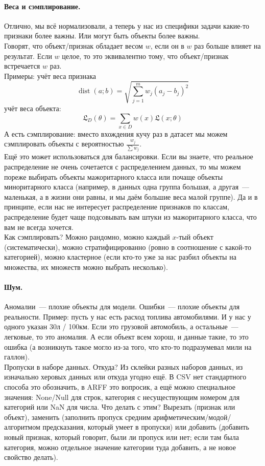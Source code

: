 \documentclass{article}
\begin{document}
    \paragraph{Веса и сэмплирование.}
    Отлично, мы всё нормализовали, а теперь у нас из специфики задачи какие-то признаки более важны. Или могут быть объекты более важны.\\
    Говорят, что объект/признак обладает весом $w$, если он в $w$ раз больше влияет на результат. Если $w$ целое, то это эквивалентно тому, что объект/признак встречается $w$ раз.\\
    Примеры: учёт веса признака
    \[
    \operatorname{dist}(a;b)=\sqrt{\sum\limits_{j=1}^mw_j(a_j-b_j)^2}
    \]
    учёт веса объекта:
    \[
    \mathfrak L_D(\theta)=\sum\limits_{x\in D}w(x)\mathfrak L(x;\theta)
    \]
    А есть сэмплирование: вместо вхождения кучу раз в датасет мы можем сэмплировать объекты с вероятностью $\frac{w_j}{\sum w_j}$.\\
    Ещё это может использоваться для балансировки. Если вы знаете, что реальное распределение не очень сочетается с распределением данных, то мы можем пореже выбирать объекты мажоритарного класса или почаще объекты миноритарного класса (например, в данных одна группа большая, а другая~--- маленькая, а в жизни они равны, и мы даём большие веса малой группе). Да и в принципе, если нас не интересует распределение признаков по классам, распределение будет чаще подсовывать вам штуки из мажоритарного класса, что вам не всегда хочется.\\
    Как сэмплировать? Можно рандомно, можно каждый $x$-тый объект (систематически), можно стратифицированно (ровно в соотношение с какой-то категорией), можно кластерное (если кто-то уже за нас разбил объекты на множества, их множеств можно выбрать несколько).
    \paragraph{Шум.}
    Аномалии~--- плохие объекты для модели. Ошибки~--- плохие объекты для реальности. Пример: пусть у нас есть расход топлива автомобилями. И у нас у одного указан 30л / 100км. Если это грузовой автомобиль, а остальные~--- легковые, то это аномалия. А если объект всем хорош, и данные такие, то это ошибка (а возникнуть такое могло из-за того, что кто-то подразумевал мили на галлон).\\
    Пропуски в наборе данных. Откуда? Из склейки разных наборов данных, из изначально херовых данных или откуда угодно ещё. В CSV нет стандартного способа это обозначить, в ARFF это вопросик, а ещё можно специальное значения: None/Null для строк, категория с несуществующим номером для категорий или NaN для числа. Что делать с этим? Вырезать (признак или объект), заменить (заполнить пропуск средним арифметическим/модой/алгоритмом предсказания, который умеет в пропуски) или добавить (добавить новый признак, который говорит, были ли пропуск или нет; если там была категория, можно отдельное значение категории туда добавить, а не новое свойство делать).
\end{document}
